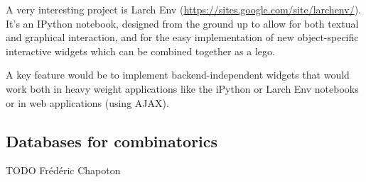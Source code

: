 \documentclass{article}
\begin{document}
A very interesting project is Larch Env
(\url{https://sites.google.com/site/larchenv/}). It's an IPython
notebook, designed from the ground up to allow for both textual and
graphical interaction, and for the easy implementation of new
object-specific interactive widgets which can be combined together as
a lego.

A key feature would be to implement backend-independent widgets that
would work both in heavy weight applications like the iPython or Larch
Env notebooks or in web applications (using AJAX).

\subsection{Databases for combinatorics}

TODO Fr\'ed\'eric Chapoton
\end{document}

